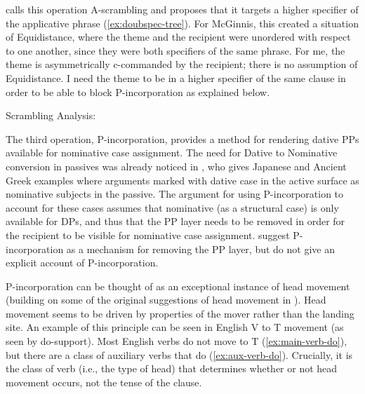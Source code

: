 \cite{McGinnis.1998} calls this operation A-scrambling and proposes that it targets a higher specifier of the applicative phrase (\ref{ex:doubspec-tree}). For McGinnis, this created a situation of Equidistance, where the theme and the recipient were unordered with respect to one another, since they were both specifiers of the same phrase. For me, the theme is asymmetrically c-commanded by the recipient; there is no assumption of Equidistance. I need the theme to be in a higher specifier of the same clause in order to be able to block P-incorporation as explained below. 

\begin{exe}
	\ex Scrambling Analysis:\label{ex:doubspec-tree}
 \end{exe} 

 The third operation, P-incorporation, provides a method for rendering dative PPs available for nominative case assignment. The need for Dative to Nominative conversion in passives was already noticed in \cite{Larson.1988}, who gives Japanese and Ancient Greek examples where arguments marked with dative case in the active surface as nominative subjects in the passive. The argument for using P-incorporation to account for these cases assumes that nominative (as a structural case) is only available for DPs, and thus that the PP layer needs to be removed in order for the recipient to be visible for nominative case assignment. \cite{Alexiadou.2014} suggest P-incorporation as a mechanism for removing the PP layer, but do not give an explicit account of P-incorporation. 

 P-incorporation can be thought of as an exceptional instance of head movement (building on some of the original suggestions of head movement in \citealt{Baker.1988}). Head movement seems to be driven by properties of the mover rather than the landing site. An example of this principle can be seen in English V to T movement (as seen by do-support). Most English verbs do not move to T (\ref{ex:main-verb-do}), but there are a class of auxiliary verbs that do (\ref{ex:aux-verb-do}). Crucially, it is the class of verb (i.e., the type of head) that determines whether or not head movement occurs, not the tense of the clause.

